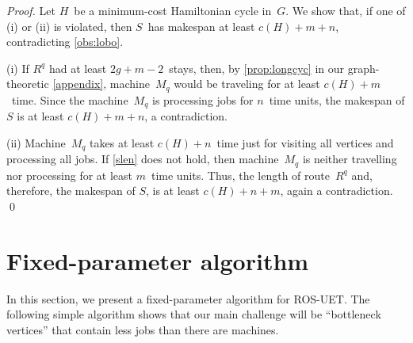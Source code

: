 \documentclass[natbib,sort,smallextended,envcountsame,envcountsect,numbook]{svjour3}
\newcommand{\ROSUPT}{\textsc{ROS-UET}}
\newcommand{\Ms}{\mathcal M}
\newcommand{\Gr}{G}
\def\pvstays{\ensuremath{{m+2g-3}}}
\begin{document}
\begin{proof}
  Let \(H\)~be a minimum-cost Hamiltonian cycle in~\(\Gr\).
  We show that, if one of (i) or (ii) is violated,
  then \(S\)~has makespan at least \(c(H)+m+n\),
  contradicting \cref{obs:lobo}.

  (i)
  If \(R^q\) had at least \(2g+m-2\)~stays,
  then,
  by \cref{prop:longcyc} in our graph-theoretic \cref{appendix},
  machine~\(M_q\) would be traveling
  for at least \(c(H)+m\)~time.
  Since the machine~\(M_q\) is processing jobs
  for \(n\)~time units,
  the makespan of \(S\) is at least \(c(H)+m+n\),
  a contradiction.
  
  (ii)
  Machine~\(M_q\) takes at least \(c(H)+n\)~time just
  for visiting all vertices and processing all jobs.
  If \eqref{slen} does not hold,
  then machine~\(M_q\) is neither travelling nor processing
  for at least \(m\)~time units.
  Thus, the length of route~\(R^q\) and,
  therefore,
  the makespan of \(S\),
  is at least \(c(H)+n+m\), again a contradiction.
  \qed
\end{proof}

\section{Fixed-parameter algorithm}\label{sec:fpt}
\noindent 
In this section, we present a fixed-parameter algorithm for \ROSUPT{}.
The following simple algorithm shows
that our main challenge will be ``bottleneck vertices'' that
contain less jobs than there are machines.
\end{document}
